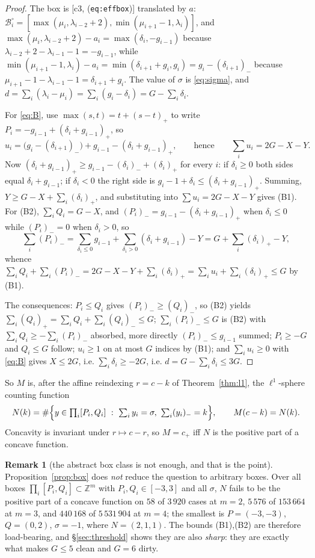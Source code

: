 \documentclass[11pt]{article}
\theoremstyle{definition}
\newtheorem{remark}[theorem]{Remark}
\newcommand{\Z}{\mathbb Z}
\newcommand{\Bx}{\mathcal B}
\newcommand{\pos}[1]{(#1)_{+}}
\newcommand{\nneg}[1]{(#1)_{-}}
\begin{document}
\begin{proof}
The box is [c3, (\texttt{eq:effbox})] translated by $a$:
$\Bx^\circ_i=[\max(\mu_i,\lambda_{i-2}+2),\min(\mu_{i+1}-1,\lambda_i)]$, and
$\max(\mu_i,\lambda_{i-2}+2)-a_i=\max(\delta_i,-g_{i-1})$ because
$\lambda_{i-2}+2-\lambda_{i-1}-1=-g_{i-1}$, while
$\min(\mu_{i+1}-1,\lambda_i)-a_i=\min(\delta_{i+1}+g_i,g_i)=g_i-\nneg{\delta_{i+1}}$
because $\mu_{i+1}-1-\lambda_{i-1}-1=\delta_{i+1}+g_i$. The value of $\sigma$ is
\eqref{eq:sigma}, and $d=\sum_i(\lambda_i-\mu_i)=\sum_i(g_i-\delta_i)=G-\sum_i\delta_i$.

For \eqref{eq:B}, use $\max(s,t)=t+\pos{s-t}$ to write
$P_i=-g_{i-1}+\pos{\delta_i+g_{i-1}}$, so
\[
  u_i=\bigl(g_i-\nneg{\delta_{i+1}}\bigr)+g_{i-1}-\pos{\delta_i+g_{i-1}},
  \qquad\text{hence}\qquad \sum_iu_i=2G-X-Y .
\]
Now $\pos{\delta_i+g_{i-1}}\ge g_{i-1}-\nneg{\delta_i}+\pos{\delta_i}$ for every $i$: if
$\delta_i\ge0$ both sides equal $\delta_i+g_{i-1}$; if $\delta_i<0$ the right side is
$g_i{-}1+\delta_i\le\pos{\delta_i+g_{i-1}}$. Summing, $Y\ge G-X+\sum_i\pos{\delta_i}$,
and substituting into $\sum u_i=2G-X-Y$ gives (B1). For (B2), $\sum_iQ_i=G-X$, and
$\nneg{P_i}=g_{i-1}-\pos{\delta_i+g_{i-1}}$ when $\delta_i\le0$ while $\nneg{P_i}=0$ when
$\delta_i>0$, so
\[
  \sum_i\nneg{P_i}=\sum_{\delta_i\le0}g_{i-1}+\sum_{\delta_i>0}(\delta_i+g_{i-1})-Y
  =G+\sum_i\pos{\delta_i}-Y,
\]
whence $\sum_iQ_i+\sum_i\nneg{P_i}=2G-X-Y+\sum_i\pos{\delta_i}=\sum_iu_i+\sum_i\pos{\delta_i}\le G$
by (B1).

The consequences: $P_i\le Q_i$ gives $\nneg{P_i}\ge\nneg{Q_i}$, so (B2) yields
$\sum_i\pos{Q_i}=\sum_iQ_i+\sum_i\nneg{Q_i}\le G$; $\sum_i\nneg{P_i}\le G$ is (B2) with
$\sum_iQ_i\ge-\sum_i\nneg{P_i}$ absorbed, more directly $\nneg{P_i}\le g_{i-1}$ summed;
$P_i\ge-G$ and $Q_i\le G$ follow; $u_i\ge1$ on at most $G$ indices by (B1); and
$\sum_iu_i\ge0$ with \eqref{eq:B} gives $X\le2G$, i.e.
$\sum_i\delta_i\ge-2G$, i.e. $d=G-\sum_i\delta_i\le3G$.
\end{proof}

So $M$ is, after the affine reindexing $r=c-k$ of Theorem~\ref{thm:l1}, the
$\ell^1$-sphere counting function
\begin{equation}\label{eq:N}
  N(k)=\#\Bigl\{y\in\textstyle\prod_i[P_i,Q_i]\ :\ \sum_iy_i=\sigma,\ \sum_i\nneg{y_i}=k\Bigr\},
  \qquad M(c-k)=N(k).
\end{equation}
Concavity is invariant under $r\mapsto c-r$, so $M=c_+$ iff $N$ is the positive part of a
concave function.

\begin{remark}[the abstract box class is not enough, and that is the point]\label{rem:abstract}
Proposition~\ref{prop:box} does \emph{not} reduce the question to arbitrary boxes.
Over all boxes $\prod_i[P_i,Q_i]\subset\Z^m$ with $P_i,Q_i\in[-3,3]$ and all $\sigma$,
$N$ fails to be the positive part of a concave function on $58$ of $3\,920$ cases at
$m=2$, $5\,576$ of $153\,664$ at $m=3$, and $440\,168$ of $5\,531\,904$ at $m=4$; the
smallest is $P=(-3,-3)$, $Q=(0,2)$, $\sigma=-1$, where $N=(2,1,1)$. The bounds (B1),(B2)
are therefore load-bearing, and \S\ref{sec:threshold} shows they are also \emph{sharp}:
they are exactly what makes $G\le5$ clean and $G=6$ dirty.
\end{remark}
\end{document}
